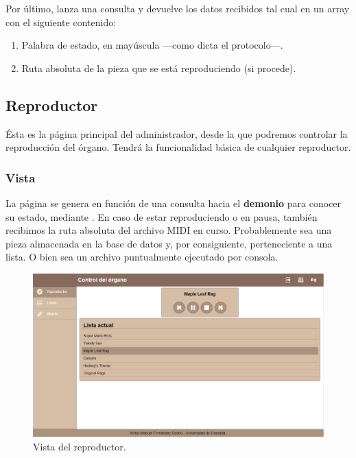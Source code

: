 Por último,  lanza una consulta y devuelve los datos recibidos tal cual en un array con el siguiente contenido:

\begin{enumerate}
	\item Palabra de estado, en mayúscula ---como dicta el protocolo---.
	\item Ruta absoluta de la pieza que se está reproduciendo (si procede).
\end{enumerate}

\subsection{Reproductor}

Ésta es la página principal del administrador, desde la que podremos controlar la reproducción del órgano. Tendrá la funcionalidad básica de cualquier reproductor.

\subsubsection{Vista}

La página se genera en función de una consulta hacia el \textbf{demonio} para conocer su estado, mediante . En caso de estar reproduciendo o en pausa, también recibimos la ruta absoluta del archivo MIDI en curso. Probablemente sea una pieza almacenada en la base de datos y, por consiguiente, perteneciente a una lista. O bien sea un archivo puntualmente ejecutado por consola.

\smallskip

\begin{figure}[H]
	\noindent \begin{centering}
		\includegraphics[width=\linewidth*3/4]{capitulo5/cap_reproductor}
		\par\end{centering}
	\smallskip
	\caption{\label{fig:cap_reproductor} Vista del reproductor.}
\end{figure} 

